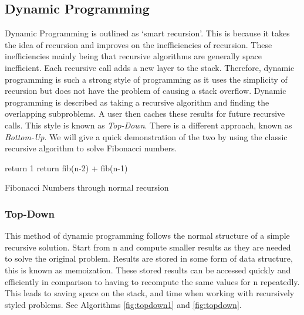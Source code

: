 \documentclass[10pt,twocolumn]{IEEEtran}
\begin{document}
\subsection{Dynamic Programming}
Dynamic Programming is outlined as `smart recursion'. This is because it takes the idea of recursion and improves on the inefficiencies of recursion. These inefficiencies mainly being that recursive algorithms are generally space inefficient. Each recursive call adds a new layer to the stack. Therefore, dynamic programming is such a strong style of programming as it uses the simplicity of recursion but does not have the problem of causing a stack overflow. Dynamic programming  is described as taking a recursive algorithm and finding the overlapping subproblems. A user then caches these results for future recursive calls.
This style is known as \textit{Top-Down}. There is a different approach, known as \textit{Bottom-Up}. We will give a quick demonstration of the two by using the classic recursive algorithm to solve Fibonacci numbers.
\IncMargin{1em}
	\begin{algorithm}
		
		 {return 1\;}
		return fib(n-2) + fib(n-1)\;
			
	\caption{Fibonacci Numbers through normal recursion}
	\end{algorithm}
\DecMargin{1em}
	
	\subsubsection{Top-Down}
	This method of dynamic programming follows the normal structure of a simple recursive solution. Start from n and compute smaller results as they are needed to solve the original problem. Results are stored in some form of data structure, this is known as memoization. These stored results can be accessed quickly and efficiently in comparison to having to recompute the same values for n repeatedly. This leads to saving space on the stack, and time when working with recursively styled problems. See Algorithms \ref{fig:topdown1} and \ref{fig:topdown}.
	
\end{document}

